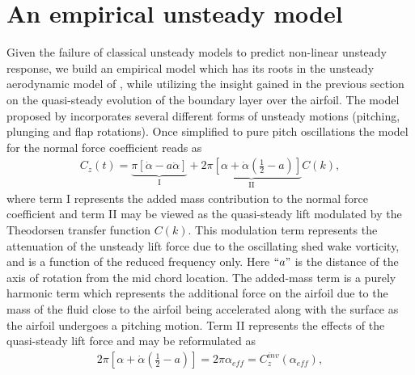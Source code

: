 \section{An empirical unsteady model}
Given the failure of classical unsteady models to predict non-linear unsteady response, we build an empirical model which has its roots in the unsteady aerodynamic model of \cite{theodorsen35}, while utilizing the insight gained in the previous section on the quasi-steady evolution of the boundary layer over the airfoil. The model proposed by \cite{theodorsen35} incorporates several different forms of unsteady motions (pitching, plunging and flap rotations). Once simplified to pure pitch oscillations the model for the normal force coefficient reads as
\begin{align}
	C_{z}(t) = \underbrace{\pi [\dot{\alpha} - a\ddot{\alpha}]}_{\text{I}} + \underbrace{2\pi [\alpha + \dot{\alpha}(\frac{1}{2} - a)]}_{\text{II}}C(k),
\end{align}
where term I represents the added mass contribution to the normal force coefficient and term II may be viewed as the quasi-steady lift modulated by the Theodorsen transfer function $C(k)$. This modulation term represents the attenuation of the unsteady lift force due to the oscillating shed wake vorticity, and is a function of the reduced frequency only. Here $``a"$ is the distance of the axis of rotation from the mid chord location. The added-mass term is a purely harmonic term which represents the additional force on the airfoil due to the mass of the fluid close to the airfoil being accelerated along with the surface as the airfoil undergoes a pitching motion. Term II represents the effects of the quasi-steady lift force and may be reformulated as
\begin{align}
	2\pi [\alpha + \dot{\alpha}(\frac{1}{2} - a)] = 2\pi\alpha_{eff} = C^{inv}_{z}(\alpha_{eff}),
\end{align}
